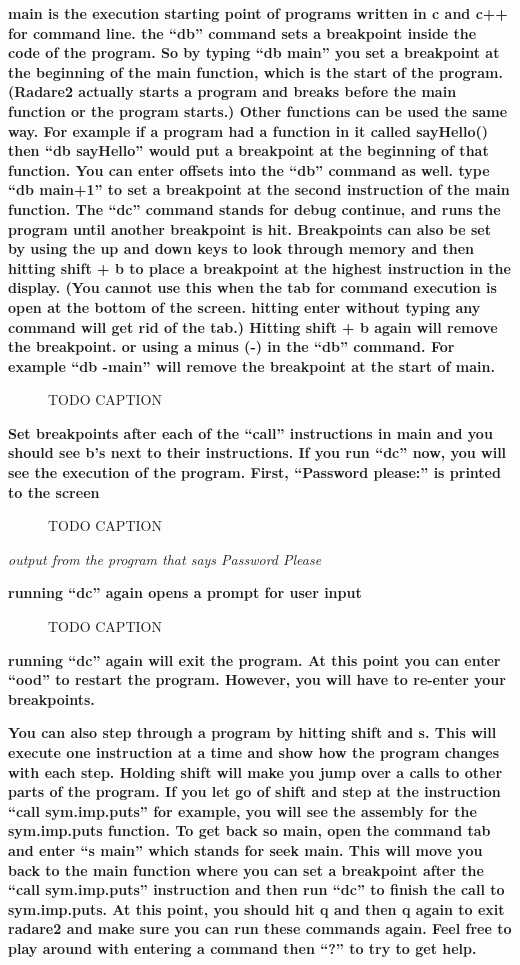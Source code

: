 \documentclass[letterpaper]{article}
\newcommand{\sitfig}[3]{
\begin{figure}[H]
\centering
\makebox[\textwidth][c]{
#2
}
\caption{#3}
\label{#1}
\end{figure}
}
\newcommand{\sitgfx}[4][scale=1.0]{
\sitfig{#3}{\texttt{[image: \#2]}}{#4}
}
\begin{document}
\textbf{main is the execution starting point of programs written in c and c++ for command line. the ``db'' command sets
a breakpoint inside the code of the program. So by typing ``db main'' you set a breakpoint at the beginning of the main
function, which is the start of the program. (Radare2 actually starts a program and breaks before the main function or
the program starts.) Other functions can be used the same way. For example if a program had a function in it called
sayHello() then ``db sayHello'' would put a breakpoint at the beginning of that function. You can enter offsets into
the ``db'' command as well. type ``db main+1'' to set a breakpoint at the second instruction of the main function. The
``dc'' command stands for debug continue, and runs the program until another breakpoint is hit. Breakpoints can also be
set by using the up and down keys to look through memory and then hitting shift + b to place a breakpoint at the
highest instruction in the display. (You cannot use this when the tab for command execution is open at the bottom of
the screen. hitting enter without typing any command will get rid of the tab.) Hitting shift + b again will remove the
breakpoint. or using a minus (-) in the ``db'' command. For example ``db -main'' will remove the breakpoint at the
start of main.}

  
\sitgfx[width=5.8335in,height=3.6457in]{FINALWORKINGDOCFORMERLYPRECURSOR-img081.png}{fig:unk}{TODO CAPTION}
 

\textbf{Set breakpoints after each of the ``call'' instructions in main and you should see b's next to their
instructions. If you run ``dc'' now, you will see the execution of the program. First, ``Password please:'' is printed
to the screen}

  
\sitgfx[width=5.8335in,height=3.6457in]{FINALWORKINGDOCFORMERLYPRECURSOR-img082.png}{fig:unk}{TODO CAPTION}
 

\textit{output from the program that says Password Please}

\textbf{running ``dc'' again opens a prompt for user input}

  
\sitgfx[width=5.8335in,height=3.6457in]{FINALWORKINGDOCFORMERLYPRECURSOR-img085.png}{fig:unk}{TODO CAPTION}
 

\textbf{running ``dc'' again will exit the program. At this point you can enter ``ood'' to restart the program. However,
you will have to re-enter your breakpoints.}

\textbf{You can also step through a program by hitting shift and s. This will execute one instruction at a time and show
how the program changes with each step. Holding shift will make you jump over a calls to other parts of the program. If
you let go of shift and step at the instruction ``call sym.imp.puts'' for example, you will see the assembly for the
sym.imp.puts function. To get back so main, open the command tab and enter ``s main'' which stands for seek main. This
will move you back to the main function where you can set a breakpoint after the ``call sym.imp.puts'' instruction and
then run ``dc'' to finish the call to sym.imp.puts. At this point, you should hit q and then q again to exit radare2
and make sure you can run these commands again. Feel free to play around with entering a command then ``?'' to try to
get help.}
\end{document}
